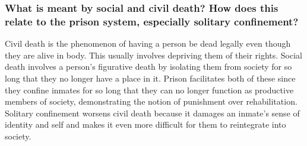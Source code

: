 \documentclass[letterpaper, 12pt]{article}
\begin{document}
\subsubsection*{What is meant by social and civil death? How does this relate
to the prison system, especially solitary confinement?}
Civil death is the phenomenon of having a person be dead legally even though
they are alive in body. This usually involves depriving them of their rights.
Social death involves a person's figurative death by isolating them from society
for so long that they no longer have a place in it. Prison facilitates both of
these since they confine inmates for so long that they can no longer function
as productive members of society, demonstrating the notion of punishment over
rehabilitation. Solitary confinement worsens civil death because it damages an
inmate's sense of identity and self and makes it even more difficult for them
to reintegrate into society.
\end{document}
